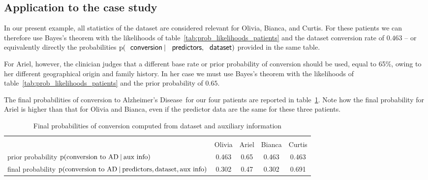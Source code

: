 \documentclass[utf8]{FrontiersinHarvard} %
\newcommand*{\p}{\mathrm{p}}%
\renewcommand*{\|}[1][]{\nonscript\:#1\vert\nonscript\:\mathopen{}}
\newcommand*{\ad}{Alzheimer's Disease}
\newcommand*{\mci}{Mild Cognitive Impairment}
\begin{document}


\subsection{Application to the case study}
\label{sec:posterior_application}

In our present example, all statistics of the dataset are considered relevant for Olivia, Bianca, and Curtis. For these patients we can therefore use Bayes's theorem with the likelihoods of table~\ref{tab:prob_likelihoods_patients} and the dataset conversion rate of $0.463$ -- or equivalently directly the probabilities $\p(\textsf{\small conversion} \| \textsf{\small predictors}, \textsf{\small dataset})$ provided in the same table.

For Ariel, however, the clinician judges that a different base rate or prior probability of conversion should be used, equal to 65\%,  owing to her different geographical origin and family history. In her case we must use Bayes's theorem with the likelihoods of table~\ref{tab:prob_likelihoods_patients} and the prior probability of $0.65$.

The final probabilities of conversion to \ad\ for our four patients are reported in table~\ref{tab:posterior_patients}. Note how the final probability for Ariel is higher than that for Olivia and Bianca, even if the predictor data are the same for these three patients.

\medskip
\begin{table}[!h]
  \centering
  \begin{tabular}{lcccc}
    \hline\\[-1.5\jot]
    &{\small Olivia} &{\small Ariel} &{\small Bianca} &{\small Curtis}
    \\[\jot]
    {\small prior probability $\p(\text{conversion to AD} \| \text{aux info})$}&
    0.463&0.65&0.463&0.463
    \\
    {\small final probability $\p(\text{conversion to AD} \| \text{predictors}, \text{dataset}, \text{aux info})$}&
    0.302&0.47&0.302&0.691
    \\[\jot]
    \hline
  \end{tabular}
    \caption{Final probabilities of conversion computed from dataset and auxiliary information}\label{tab:posterior_patients}
\end{table}
\end{document}
